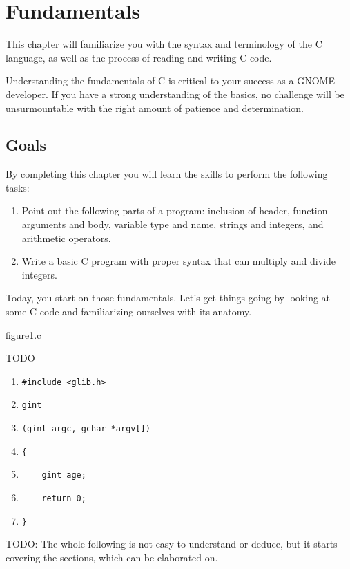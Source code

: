 \chapter{Fundamentals}

This chapter will familiarize you with the syntax and terminology of the C
language, as well as the process of reading and writing C code.

Understanding the fundamentals of C is critical to your success as a GNOME
developer. If you have a strong understanding of the basics, no challenge will 
be unsurmountable with the right amount of patience and determination.

\section{Goals}

By completing this chapter you will learn the skills to perform the following
tasks:

\begin{enumerate}
\item Point out the following parts of a program: inclusion of header, function
arguments and body, variable type and name, strings and integers, and
arithmetic operators.
\item Write a basic C program with proper syntax that can multiply and divide
integers.
\end{enumerate}


Today, you start on those fundamentals. Let's get things going by looking at
some C code and familiarizing ourselves with its anatomy.


\begin{code}{figure1.c}

\end{code}

TODO
\begin{enumerate}
\item \verb|#include <glib.h>|
\item \verb|gint|
\item \verb|(gint argc, gchar *argv[])|
\item \verb|{|
\item \verb|    gint age;|
\item \verb|    return 0;|
\item \verb|}|
\end{enumerate}

TODO: The whole following is not easy to understand or deduce, but it
starts covering the sections, which can be elaborated on.

